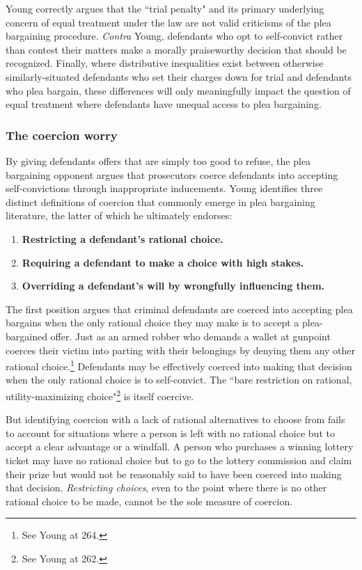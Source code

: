 Young correctly argues that the ``trial penalty" and its primary underlying concern of equal treatment under the law are not valid criticisms of the plea bargaining procedure. \textit{Contra} Young, defendants who opt to self-convict rather than contest their matters make a morally praiseworthy decision that should be recognized. Finally, where distributive inequalities exist between otherwise similarly-situated defendants who set their charges down for trial and defendants who plea bargain, these differences will only meaningfully impact the question of equal treatment where defendants have unequal access to plea bargaining. 

\subsubsection{The coercion worry}

By giving defendants offers that are simply too good to refuse, the plea bargaining opponent argues that prosecutors coerce defendants into accepting self-convictions through inappropriate inducements. Young identifies three distinct definitions of coercion that commonly emerge in plea bargaining literature, the latter of which he ultimately endorses:

\begin{enumerate}
    \item \textbf{Restricting a defendant's rational choice.}
    \item \textbf{Requiring a defendant to make a choice with high stakes.}
    \item \textbf{Overriding a defendant's will by wrongfully influencing them.}
\end{enumerate}

The first position argues that criminal defendants are coerced into accepting plea bargains when the only rational choice they may make is to accept a plea-bargained offer. Just as an armed robber who demands a wallet at gunpoint coerces their victim into parting with their belongings by denying them any other rational choice.\footnote{See Young at 264.} Defendants may be effectively coerced into making that decision when the only rational choice is to self-convict. The ``bare restriction on rational, utility-maximizing choice"\footnote{See Young at 262.} is itself coercive. 

But identifying coercion with a lack of rational alternatives to choose from fails to account for situations where a person is left with no rational choice but to accept a clear advantage or a windfall. A person who purchases a winning lottery ticket may have no rational choice but to go to the lottery commission and claim their prize but would not be reasonably said to have been coerced into making that decision. \textit{Restricting choices}, even to the point where there is no other rational choice to be made, cannot be the sole measure of coercion.

